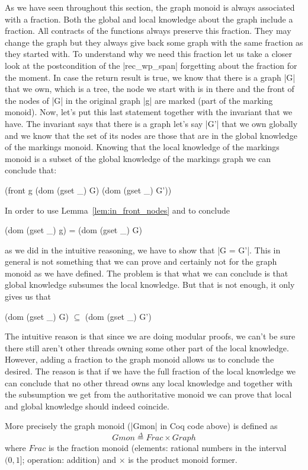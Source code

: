 \documentclass[nocopyrightspace]{sigplanconf}
\newcommand{\defeq}{\overset{\Delta}{=}}
\newcommand{\Frac}{\mathit{Frac}}
\begin{document}
As we have seen throughout this section, the graph monoid is always
associated with a fraction.
Both the global and local knowledge about the graph include a fraction.
All contracts of the functions always preserve this fraction.
They may change the graph but they always give back some graph with
the same fraction as they started with.
To understand why we need this fraction let us take a closer look at the
postcondition of the \Coqe|rec_wp_span| forgetting about the fraction for
the moment.
In case the return result is true, we know that there is a graph \Coqe|G|
that we own, which is a tree, the node we start with is in there and
the front of the nodes of \Coqe|G| in the original graph \Coqe|g| are marked (part of the marking monoid).
Now, let's put this last statement together with the invariant that we have.
The invariant says that there is a graph let's say \Coqe|G'| that we own
globally and we know that the set of its nodes are those that are
in the global knowledge of the markings monoid.
Knowing that the local knowledge of the markings monoid is a subset of
the global knowledge of the markings graph we can conclude that:
\begin{Coq}
(front g (dom (gset _) G) (dom (gset _) G'))
\end{Coq}
In order to use Lemma~\ref{lem:in_front_nodes} and to conclude
\begin{Coq}
(dom (gset _) g) = (dom (gset _) G)
\end{Coq}
as we did in the intuitive reasoning, we have to show that \Coqe|G = G'|.
This in general is not something that we can prove and certainly not for
the graph monoid as we have defined.
The problem is that what we can conclude is that global knowledge
subsumes the local knowledge.
But that is not enough, it only gives us that 
\begin{Coq}
(dom (gset _) G) $\subseteq$ (dom (gset _) G')
\end{Coq}
The intuitive reason is that since we are doing modular proofs, we can't
be sure there still aren't other threads owning some other part of the
local knowledge.
However, adding a fraction to the graph monoid allows us to conclude
the desired.
The reason is that if we have the full fraction of the local knowledge
we can conclude that no other thread owns any local knowledge and
together with the subsumption we get from the authoritative monoid
we can prove that local and global knowledge should indeed coincide.

More precisely the graph monoid (\Coqe|Gmon| in Coq code above) is defined as
\[
\mathit{Gmon} \defeq \Frac \times \mathit{Graph}
\]
where $\Frac$ is the fraction monoid (elements: rational numbers in the interval $(0, 1]$; operation:  addition) and $\times$ is the product monoid former.
\end{document}
